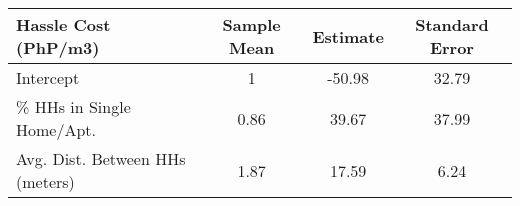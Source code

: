 \begin{tabular}{lccc}
Hassle Cost (PhP/m3) & Sample Mean & Estimate & Standard Error \\
\hline
Intercept & 1 &-50.98 &32.79\\
\% HHs in Single Home/Apt.  &0.86&39.67&37.99\\
Avg. Dist. Between HHs (meters) &1.87&17.59&6.24\\
\hline
\end{tabular} 
